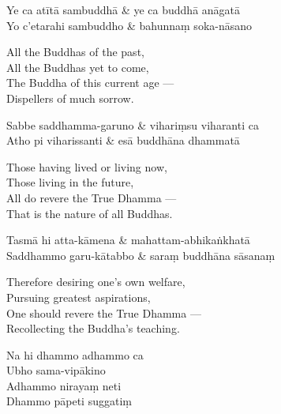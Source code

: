 
\begin{twochants}
  Ye ca atītā sambuddhā & ye ca buddhā anāgatā \\
  Yo c'etarahi sambuddho & bahunnaṃ soka-nāsano \\
\end{twochants}

\begin{english}
  All the Buddhas of the past,\\
  All the Buddhas yet to come,\\
  The Buddha of this current age ---\\
  Dispellers of much sorrow.
\end{english}

\begin{twochants}
  Sabbe saddhamma-garuno & vihariṃsu viharanti ca \\
  Atho pi viharissanti & esā buddhāna dhammatā \\
\end{twochants}

\begin{english}
  Those having lived or living now,\\
  Those living in the future,\\
  All do revere the True Dhamma ---\\
  That is the nature of all Buddhas.
\end{english}

\begin{twochants}
  Tasmā hi atta-kāmena & mahattam-abhikaṅkhatā \\
  Saddhammo garu-kātabbo & saraṃ buddhāna sāsanaṃ \\
\end{twochants}

\begin{english}
  Therefore desiring one's own welfare,\\
  Pursuing greatest aspirations,\\
  One should revere the True Dhamma ---\\
  Recollecting the Buddha's teaching.
\end{english}


\begin{paritta}
  Na hi dhammo adhammo ca\\
  Ubho sama-vipākino \\
  Adhammo nirayaṃ neti\\
  Dhammo pāpeti suggatiṃ
\end{paritta}

